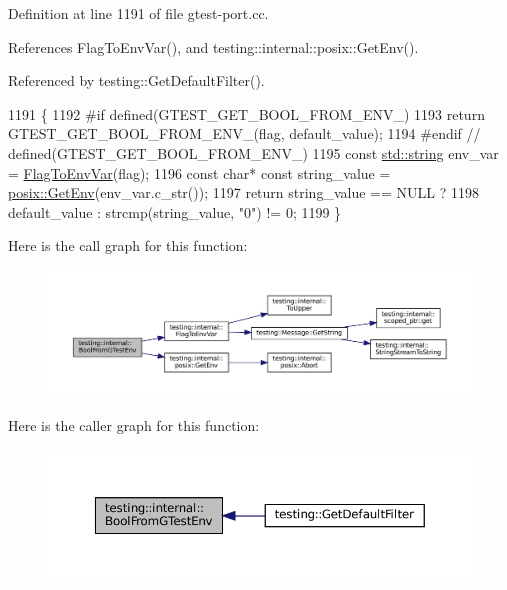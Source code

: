 Definition at line 1191 of file gtest-\/port.\+cc.



References Flag\+To\+Env\+Var(), and testing\+::internal\+::posix\+::\+Get\+Env().



Referenced by testing\+::\+Get\+Default\+Filter().


\begin{DoxyCode}
1191                                                             \{
1192 \textcolor{preprocessor}{#if defined(GTEST\_GET\_BOOL\_FROM\_ENV\_)}
1193   \textcolor{keywordflow}{return} GTEST\_GET\_BOOL\_FROM\_ENV\_(flag, default\_value);
1194 \textcolor{preprocessor}{#endif  // defined(GTEST\_GET\_BOOL\_FROM\_ENV\_)}
1195   \textcolor{keyword}{const} \hyperlink{namespacetesting_1_1internal_a8e8ff5b11e64078831112677156cb111}{std::string} env\_var = \hyperlink{namespacetesting_1_1internal_a7540386ecf74d7ab7e2fa6089db94682}{FlagToEnvVar}(flag);
1196   \textcolor{keyword}{const} \textcolor{keywordtype}{char}* \textcolor{keyword}{const} string\_value = \hyperlink{namespacetesting_1_1internal_1_1posix_a1d5e3da5a27eed25986859fa83cafe95}{posix::GetEnv}(env\_var.c\_str());
1197   \textcolor{keywordflow}{return} string\_value == NULL ?
1198       default\_value : strcmp(string\_value, \textcolor{stringliteral}{"0"}) != 0;
1199 \}
\end{DoxyCode}
Here is the call graph for this function\+:
\nopagebreak
\begin{figure}[H]
\begin{center}
\leavevmode
\includegraphics[width=350pt]{namespacetesting_1_1internal_a67132cdce23fb71b6c38ee34ef81eb4c_cgraph}
\end{center}
\end{figure}
Here is the caller graph for this function\+:
\nopagebreak
\begin{figure}[H]
\begin{center}
\leavevmode
\includegraphics[width=350pt]{namespacetesting_1_1internal_a67132cdce23fb71b6c38ee34ef81eb4c_icgraph}
\end{center}
\end{figure}
\mbox{\label{namespacetesting_1_1internal_a8ec00d458d0d442bd64af7b5f9c22dda}} 

